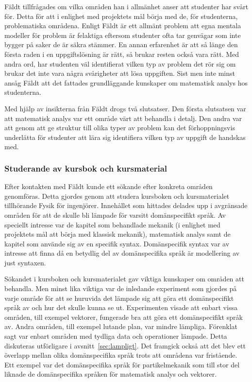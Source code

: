 Fäldt tillfrågades om vilka områden han i allmänhet anser att studenter har
svårt för. Detta för att i enlighet med projektets mål börja med de, för
studenterna, problematiska områdena. Enligt Fäldt är ett allmänt problem att
egna mentala modeller för problem är felaktiga eftersom studenter ofta tar
genvägar som inte bygger på saker de är säkra stämmer. En annan erfarenhet
är att så länge den första raden i en uppgiftslösning är rätt, så brukar
resten också vara rätt. Med andra ord, har studenten väl identifierat vilken typ av
problem det rör sig om brukar det inte vara några svårigheter att lösa
uppgiften. Sist men inte minst ansåg Fäldt att det fattades grundläggande
kunskaper om matematisk analys hos studenterna.

Med hjälp av insikterna från Fäldt drogs två slutsatser. Den första slutsatsen
var att matematisk analys var ett område värt att behandla i detalj. Den andra
var att genom att ge struktur till olika typer av problem kan det
förhoppningsvis underlätta för studenter att lära sig identifiera vilken
typ av uppgift de handskas med.

\subsubsection*{Studerande av kursbok och kursmaterial}

Efter kontakten med Fäldt kunde ett sökande efter konkreta områden genomföras.
Detta gjordes genom att studera kursboken och kursmaterialet tillhörande Fysik
för ingenjörer. Innehållet som hittades delades upp i avgränsade områden för att
de skulle bli lämpade för varsitt domänspecifikt språk. Av speciellt intresse
var de kapitel som behandlade mekanik (i enlighet med projektets mål att börja
med klassisk mekanik), matematisk analys samt de kapitel som använde sig av en
specifik syntax. Domänspecifik syntax var av intresse att finna
då en betydlig del av domänspecifika språk är modellering av just syntaxen.

Sökandet i kursboken och kursmaterialet gav viktiga kunskaper om områden att
behandla. Men minst lika viktiga var de inledande experiment som gjordes på
varje område för att se huruvida det lämpade sig att göra ett domänspecifikt
språk av och hur det skulle kunna se ut. Experimenten visade att enbart vissa
områden, till exempel vektorer, fungerade bra att göra ett domänspecifikt språk
av. Andra områden, till exempel lutande plan, var mindre lämpliga. Förenklat
sagt var enbart områden med tydliga data och operationer lämpade. Detta
diskuteras utförligare i avsnitt~\ref{sec:lampligt}. Det framgick också att det
blev ett överlapp mellan olika domänspecifika språk trots att områdena var fristående.
Ett exempel var det domänspecifika språk för partikelmekanik som till stor del
liknade de domänspecifika språken för matematisk analys och vektorer.

